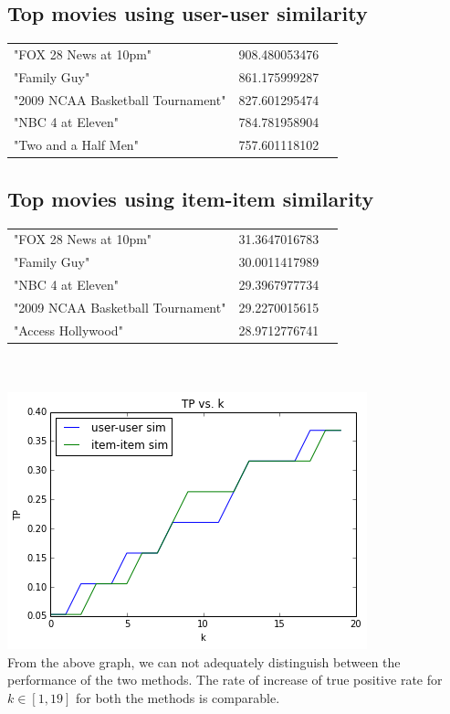 \documentclass[11pt]{article}
\begin{document}
{\subsection*{Top movies using user-user similarity}
\begin{tabular}{ l c r }
"FOX 28 News at 10pm" & 908.480053476\\
"Family Guy" & 861.175999287\\
"2009 NCAA Basketball Tournament" & 827.601295474\\
"NBC 4 at Eleven" & 784.781958904\\
"Two and a Half Men" & 757.601118102\\
\end{tabular}

\subsection*{Top movies using item-item similarity}
\begin{tabular}{ l c r }
"FOX 28 News at 10pm" & 31.3647016783\\
"Family Guy" & 30.0011417989\\
"NBC 4 at Eleven" & 29.3967977734\\
"2009 NCAA Basketball Tournament" & 29.2270015615\\
"Access Hollywood" & 28.9712776741\\
\end{tabular}\\
\\

\includegraphics*{q1cc}\\

From the above graph, we can not adequately distinguish between the performance of the two methods. The rate of increase of true positive rate for $k \in [1,19]$ for both the methods is comparable.

}
\end{document}
